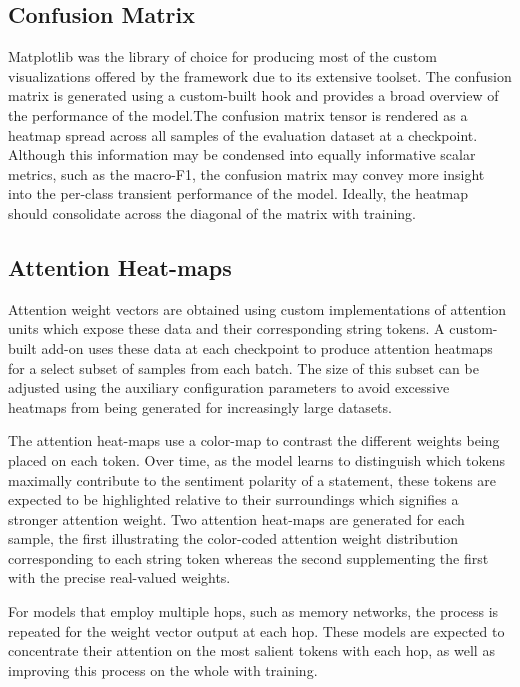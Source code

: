 \documentclass[../../fyp.tex]{subfiles}
\begin{document}
\subsection{Confusion Matrix}
Matplotlib was the library of choice for producing most of the custom visualizations offered by the framework due to its extensive toolset. The confusion matrix is generated using a custom-built hook and provides a broad overview of the performance of the model.The confusion matrix tensor is rendered as a heatmap spread across all samples of the evaluation dataset at a checkpoint. Although this information may be condensed into equally informative scalar metrics, such as the macro-F1, the confusion matrix may convey more insight into the per-class transient performance of the model. Ideally, the heatmap should consolidate across the diagonal of the matrix with training.

\subsection{Attention Heat-maps}
Attention weight vectors are obtained using custom implementations of attention units which expose these data and their corresponding string tokens. A custom-built add-on uses these data at each checkpoint to produce attention heatmaps for a select subset of samples from each batch. The size of this subset can be adjusted using the auxiliary configuration parameters to avoid excessive heatmaps from being generated for increasingly large datasets. 

The attention heat-maps use a color-map to contrast the different weights being placed on each token. Over time, as the model learns to distinguish which tokens maximally contribute to the sentiment polarity of a statement, these tokens are expected to be highlighted relative to their surroundings which signifies a stronger attention weight. Two attention heat-maps are generated for each sample, the first illustrating the color-coded attention weight distribution corresponding to each string token whereas the second supplementing the first with the precise real-valued weights.

For models that employ multiple hops, such as memory networks, the process is repeated for the weight vector output at each hop. These models are expected to concentrate their attention on the most salient tokens with each hop, as well as improving this process on the whole with training.
\end{document}
